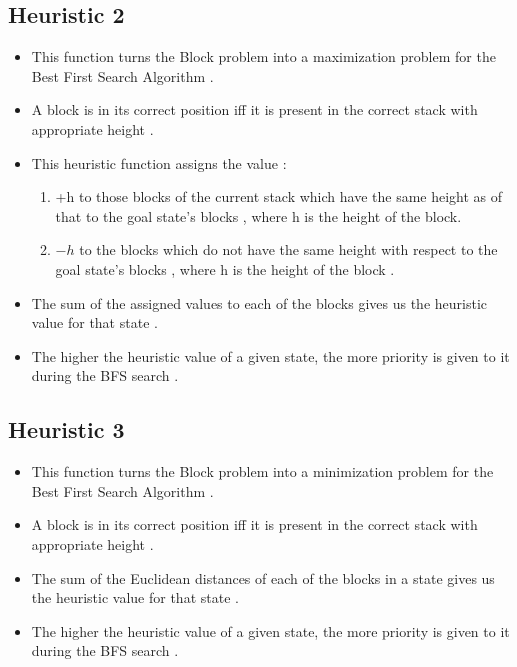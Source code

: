 \documentclass{article}
\begin{document}
\subsection{Heuristic 2}
\begin{itemize}
    \item This function turns the Block problem into a maximization problem for the Best First Search Algorithm .
    \item A block is in its correct position iff it is present in the correct stack with appropriate height .  
    \item This heuristic function assigns the value :
    \begin{enumerate}
        \item+h to those blocks of the current stack which
        have the same height as of that to the goal state's blocks , where h is the height of the block.
        \item$-h$ to the blocks which do not have the same height with respect to the
        goal state's blocks , where h is the height of the block .
    \end{enumerate}
    \item The sum of the assigned values to each of the blocks gives us the heuristic value for that state .
    \item The higher the heuristic value of a given state, the more priority is given to it during the BFS search .
\end{itemize}

\subsection{Heuristic 3}
\begin{itemize}
    \item This function turns the Block problem into a minimization problem for the Best First Search Algorithm .
    \item A block is in its correct position iff it is present in the correct stack with appropriate height .  
    \item The sum of the Euclidean distances of each of the blocks in a state gives us the heuristic value for that state .
    \item The higher the heuristic value of a given state, the more priority is given to it during the BFS search .
\end{itemize}
\newpage
\end{document}
